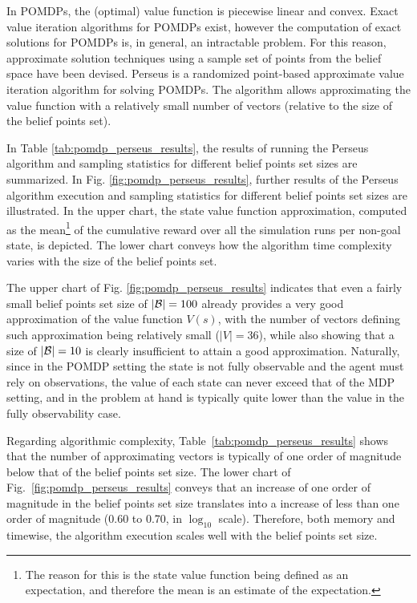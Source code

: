 \documentclass[a4paper]{article}
\begin{document}
In POMDPs, the (optimal) value function is piecewise linear and convex. Exact value iteration algorithms for POMDPs exist, however the computation of exact solutions for POMDPs is, in general, an intractable problem. For this reason, approximate solution techniques using a sample set of points from the belief space have been devised. Perseus is a randomized point-based approximate value iteration algorithm for solving POMDPs. The algorithm allows approximating the value function with a relatively small number of vectors (relative to the size of the belief points set).

In Table \ref{tab:pomdp_perseus_results}, the results of running the Perseus algorithm and sampling statistics for different belief points set sizes are summarized. In Fig. \ref{fig:pomdp_perseus_results}, further results of the Perseus algorithm execution and sampling statistics for different belief points set sizes are illustrated. In the upper chart, the state value function approximation, computed as the mean\footnote{The reason for this is the state value function being defined as an expectation, and therefore the mean is an estimate of the expectation.} of the cumulative reward over all the simulation runs per non-goal state, is depicted. The lower chart conveys how the algorithm time complexity varies with the size of the belief points set.

The upper chart of Fig. \ref{fig:pomdp_perseus_results} indicates that even a fairly small belief points set size of $| {\cal B} |=100$ already provides a very good approximation of the value function $V(s)$, with the number of vectors defining such approximation being relatively small ($| V |=36$), while also showing that a size of $| {\cal B} |=10$ is clearly insufficient to attain a good approximation. Naturally, since in the POMDP setting the state is not fully observable and the agent must rely on observations, the value of each state can never exceed that of the MDP setting, and in the problem at hand is typically quite lower than the value in the fully observability case.

Regarding algorithmic complexity, Table~\ref{tab:pomdp_perseus_results} shows that the number of approximating vectors is typically of one order of magnitude below that of the belief points set size. The lower chart of Fig.~\ref{fig:pomdp_perseus_results} conveys that an increase of one order of magnitude in the belief points set size translates into a increase of less than one order of magnitude (0.60 to 0.70, in $\log_{10}$ scale). Therefore, both memory and timewise, the algorithm execution scales well with the belief points set size.
\end{document}
